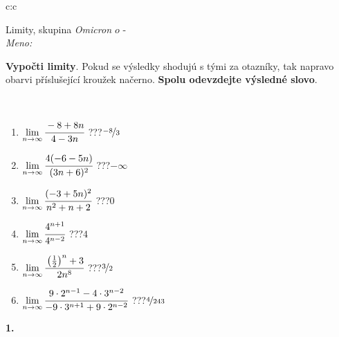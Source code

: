 \documentclass[10pt]{report}
\newcommand\omicron{o}
\begin{document}
\begin{tabular}{c:c}
\begin{minipage}[c][104.5mm][t]{0.5\linewidth}
\begin{center}
\vspace{7mm}
{\huge Limity, skupina \textit{Omicron $\omicron$} -}\\[5mm]
\textit{Meno:}\phantom{xxxxxxxxxxxxxxxxxxxxxxxxxxxxxxxxxxxxxxxxxxxxxxxxxxxxxxxxxxxxxxxxx}\\[5mm]
\begin{minipage}{0.95\linewidth}
\begin{center}
\textbf{Vypočti limity}. Pokud se výsledky shodujú s tými za otazníky, tak napravo\\obarvi příslušející kroužek načerno. \textbf{Spolu odevzdejte výsledné slovo}.
\end{center}
\end{minipage}
\\[1mm]
\begin{minipage}{0.79\linewidth}
\begin{center}
\begin{varwidth}{\linewidth}
\begin{enumerate}
\normalsize
\item $\lim\limits_{n\to\infty}\cfrac{-8+8n}{4-3n}$\quad \dotfill\; ???\;\dotfill \quad $\nicefrac{-8}{3}$
\item $\lim\limits_{n\to\infty}\cfrac{4(-6-5n)}{(3n+6)^2}$\quad \dotfill\; ???\;\dotfill \quad $-\infty$
\item $\lim\limits_{n\to\infty}\cfrac{(-3+5n)^2}{n^2+n+2}$\quad \dotfill\; ???\;\dotfill \quad $0$
\item $\lim\limits_{n\to\infty}\cfrac{4^{n+1}}{4^{n-2}}$\quad \dotfill\; ???\;\dotfill \quad $4$
\item $\lim\limits_{n\to\infty}\cfrac{\left(\frac{1}{2}\right)^n +3}{2n^{8}}$\quad \dotfill\; ???\;\dotfill \quad $\nicefrac{3}{2}$
\item $\lim\limits_{n\to\infty}\cfrac{9\cdot 2^{n-1}-4\cdot 3^{n-2}}{-9\cdot 3^{n+1}+9\cdot 2^{n-2}}$\quad \dotfill\; ???\;\dotfill \quad $\nicefrac{4}{243}$
\end{enumerate}
\end{varwidth}
\end{center}
\end{minipage}
\begin{minipage}{0.20\linewidth}
\begin{center}
{\Huge\bfseries 1.} \\[2mm]

\end{center}
\end{minipage}
\end{center}
\end{minipage}
\end{tabular}
\end{document}
